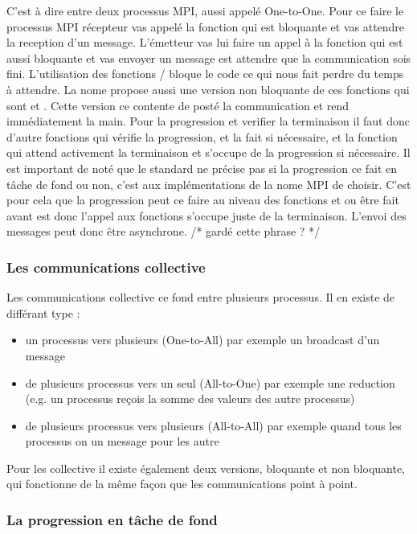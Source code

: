 C'est à dire entre deux processus MPI, aussi appelé One-to-One.
Pour ce faire le processus MPI récepteur vas appelé la fonction  qui est bloquante et vas attendre la reception d'un message.
L'émetteur vas lui faire un appel à la fonction  qui est aussi bloquante et vas envoyer un message est attendre que la communication sois fini.
L'utilisation des fonctions  /  bloque le code ce qui nous fait perdre du temps à attendre.
La nome propose aussi une version non bloquante de ces fonctions qui sont  et .
Cette version ce contente de posté la communication et rend immédiatement la main.
Pour la progression et verifier la terminaison il faut donc d'autre fonctions  qui vérifie la progression, et la fait si nécessaire, et la fonction  qui attend activement la terminaison et s'occupe de la progression si nécessaire.
Il est important de noté que le standard ne précise pas si la progression ce fait en tâche de fond ou non, c'est aux implémentations de la nome MPI de choisir.
C'est pour cela que la progression peut ce faire au niveau des fonctions  et  ou être fait avant est donc l'appel aux fonctions s'occupe juste de la terminaison.
L'envoi des messages peut donc être asynchrone. /* gardé cette phrase ? */

\subsubsection{Les communications collective}

Les communications collective ce fond entre plusieurs processus.
Il en existe de différant type :
\begin{itemize}
  \item un processus vers plusieurs (One-to-All) par exemple un broadcast d'un message
  \item de plusieurs processus vers un seul (All-to-One) par exemple une reduction (e.g. un processus reçois la somme des valeurs des autre processus)
  \item de plusieurs processus vers plusieurs (All-to-All) par exemple quand tous les processus on un message pour les autre
\end{itemize}
Pour les collective il existe également deux versions, bloquante et non bloquante, qui fonctionne de la même façon que les communications point à point.

\subsubsection{La progression en tâche de fond}

